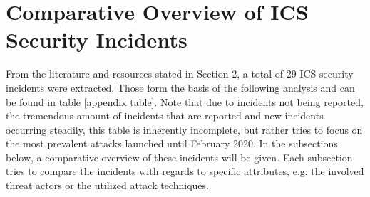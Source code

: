 \documentclass[runningheads]{llncs}
\begin{document}
\section{Comparative Overview of ICS Security Incidents}
From the literature and resources stated in Section 2, a total of 29 ICS security incidents were extracted.
Those form the basis of the following analysis and can be found in table [appendix table].
Note that due to incidents not being reported, the tremendous amount of incidents that are reported and new incidents occurring steadily, this table is inherently incomplete, but rather tries to focus on the most prevalent attacks launched until February 2020.
In the subsections below, a comparative overview of these incidents will be given.
Each subsection tries to compare the incidents with regards to specific attributes, e.g. the involved threat actors or the utilized attack techniques.
\end{document}
